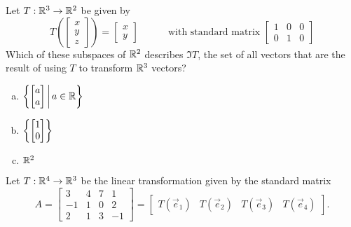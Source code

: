 \begin{applicationActivities}
\begin{activity}{5}
Let $T: \mathbb{R}^3 \rightarrow \mathbb{R}^2$ be given by
\[
  T\left(\begin{bmatrix}x \\ y\\z \end{bmatrix} \right)
    =
  \begin{bmatrix} x \\ y \end{bmatrix}
    \hspace{3em}
    \text{with standard matrix }
  \begin{bmatrix} 1 & 0 & 0 \\ 0 & 1 & 0 \end{bmatrix}
\]
Which of these subspaces of \(\mathbb{R}^2\) describes \(\Im T\),
the set of all vectors that are the result of using \(T\) to transform
\(\mathbb{R}^3\) vectors?
\begin{enumerate}[a)]
\item \(\left\{\begin{bmatrix}a \\ a\end{bmatrix}\,\middle|\,a\in\mathbb{R}\right\}\)
\item \(\left\{\begin{bmatrix}1\\0\end{bmatrix}\right\}\)
\item \(\mathbb{R}^2\)
\end{enumerate}
\end{activity}


\begin{activity}{5}
Let $T: \mathbb{R}^4 \rightarrow \mathbb{R}^3$ be the linear transformation given by the
standard matrix
\[
  A
    =
  \begin{bmatrix} 3 & 4 & 7 & 1\\ -1 & 1 & 0 & 2 \\ 2 & 1 & 3 & -1 \end{bmatrix}
    =
  \begin{bmatrix}T(\vec e_1)&T(\vec e_2)&T(\vec e_3)&T(\vec e_4)\end{bmatrix}
.\]


\end{activity}
\end{applicationActivities}
